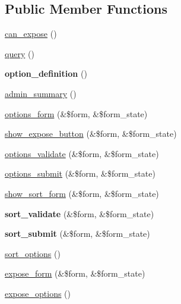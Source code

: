 \subsection*{Public Member Functions}
\begin{DoxyCompactItemize}
\item 
\hyperlink{classviews__handler__sort_aff131cfa9cf414c127c35ee655ee9e76}{can\_\-expose} ()
\item 
\hyperlink{classviews__handler__sort_a94fa33c5d037e41a927583fce2df3d18}{query} ()
\item 
\hypertarget{classviews__handler__sort_af1e8382befe67b9cd07d0bbfa9b98266}{
{\bfseries option\_\-definition} ()}
\label{classviews__handler__sort_af1e8382befe67b9cd07d0bbfa9b98266}

\item 
\hyperlink{classviews__handler__sort_a94271a6ce69bf4acb37047b01f0decaa}{admin\_\-summary} ()
\item 
\hyperlink{classviews__handler__sort_aba953218e09ab9da8f6ed0a67f046455}{options\_\-form} (\&\$form, \&\$form\_\-state)
\item 
\hyperlink{classviews__handler__sort_a1058d93ad14e1417c093a8716113be60}{show\_\-expose\_\-button} (\&\$form, \&\$form\_\-state)
\item 
\hyperlink{classviews__handler__sort_add9d1acdd648e984ca380cc3c1c092d5}{options\_\-validate} (\&\$form, \&\$form\_\-state)
\item 
\hyperlink{classviews__handler__sort_a237ebc26eda2bb393e56f9cb9eea16da}{options\_\-submit} (\&\$form, \&\$form\_\-state)
\item 
\hyperlink{classviews__handler__sort_a7099999bffa9bb2fa13ccbf5416606f3}{show\_\-sort\_\-form} (\&\$form, \&\$form\_\-state)
\item 
\hypertarget{classviews__handler__sort_afb05b006115a529518a742b2aa06b1e9}{
{\bfseries sort\_\-validate} (\&\$form, \&\$form\_\-state)}
\label{classviews__handler__sort_afb05b006115a529518a742b2aa06b1e9}

\item 
\hypertarget{classviews__handler__sort_a83dcd7f7ac007f149dc31d7f736b7c8e}{
{\bfseries sort\_\-submit} (\&\$form, \&\$form\_\-state)}
\label{classviews__handler__sort_a83dcd7f7ac007f149dc31d7f736b7c8e}

\item 
\hyperlink{classviews__handler__sort_aebff27163c4070d6eb378101dfb43b55}{sort\_\-options} ()
\item 
\hyperlink{classviews__handler__sort_ace8ed050d99d5aa5eaca415201b350e9}{expose\_\-form} (\&\$form, \&\$form\_\-state)
\item 
\hyperlink{classviews__handler__sort_a7a27b9f392c9e0dcece1b08e9b05f3ec}{expose\_\-options} ()
\end{DoxyCompactItemize}


